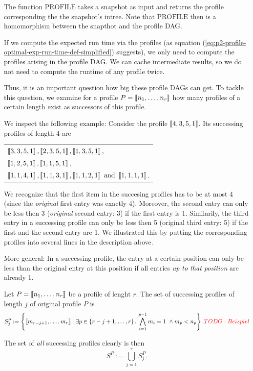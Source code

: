 The function $\text{PROFILE}$ takes a snapshot as input and returns the profile corresponding the the snapshot's intree. Note that $\text{PROFILE}$ then is a homomorphism between the snapthot and the profile DAG.

If we compute the expected run time via the profiles (as equation (\ref{eq:p2-profile-optimal-exp-run-time-def-simplified}) suggests), we only need to compute the profiles arising in the profile DAG. We can cache intermediate results, so we do not need to compute the runtime of any profile twice.

Thus, it is an important question how big these profile DAGs can get. To tackle this question, we examine for a profile $P=\left\llbracket n_1,\dots,n_r \right\rrbracket$ how many profiles of a certain length exist as successors of this profile.

We inspect the following example: Consider the profile $\left\llbracket 4,3,5,1 \right\rrbracket$. Its successing profiles of length 4 are
\begin{center}
  \begin{tabular}{l}
    $\left\llbracket 3, 3, 5, 1 \right\rrbracket, \left\llbracket 2, 3, 5, 1 \right\rrbracket, \left\llbracket 1, 3, 5, 1 \right\rrbracket,$ \\
    $\left\llbracket 1, 2, 5, 1 \right\rrbracket, \left\llbracket 1, 1, 5, 1 \right\rrbracket,$ \\
    $\left\llbracket 1, 1, 4, 1 \right\rrbracket,
    \left\llbracket 1, 1, 3, 1 \right\rrbracket,
    \left\llbracket 1, 1, 2, 1 \right\rrbracket \text{ and }
    \left\llbracket 1, 1, 1, 1 \right\rrbracket$.
  \end{tabular}
\end{center}

We recognize that the first item in the succesing profiles has to be at most 4 (since the \emph{original} first entry was exactly 4). Moreover, the second entry can only be less then 3 (\emph{original} second entry: 3) if the first entry is 1. Similarily, the third entry in a successing profile can only be less then 5 (original third entry: 5) if the first and the second entry are 1.
We illustrated this by putting the corresponding profiles into several lines in the description above.

More general: In a successing profile, the entry at a certain position can only be less than the original entry at this position if all entries \emph{up to that position} are already 1.

\begin{definition}
Let $P=\left\llbracket n_1,\dots,n_r \right\rrbracket$ be a profile of lenght $r$. The set of successing profiles of length $j$ of original profile $P$ is
\begin{equation*}
  S^p_{j}
  :=
  \left\{ 
    \profile{m_{r-j+1},\dots,m_{r}}
    \mid
    \exists p \in \left\{ r-j+1,\dots,r \right\}.\,
    \bigwedge_{i=1}^{p-1} m_i = 1 \ \wedge m_p < n_p
  \right\}.
  \todo{Beispiel}
\end{equation*}

The set of \emph{all} successing profiles clearly is then
\begin{equation*}
  S^P
  :=
  \bigcup_{j=1}^r S^P_j.
\end{equation*}
\end{definition}

